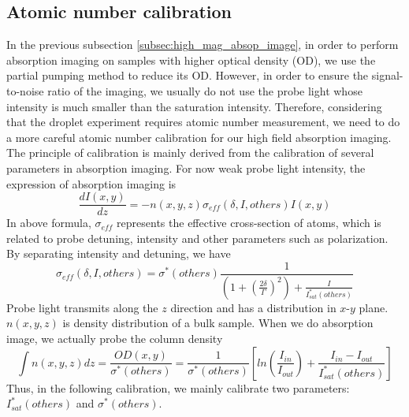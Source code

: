 \subsection{Atomic number calibration}

In the previous subsection \ref{subsec:high_mag_absop_image}, in order to perform absorption imaging on samples with higher optical density (OD), we use the partial pumping method to reduce its OD. However, in order to ensure the signal-to-noise ratio of the imaging, we usually do not use the probe light whose intensity is much smaller than the saturation intensity. Therefore, considering that the droplet experiment requires atomic number measurement, we need to do a more careful atomic number calibration for our high field absorption imaging. The principle of calibration is mainly derived from the calibration of several parameters in absorption imaging. For now weak probe light intensity, the expression of absorption imaging is
\begin{equation}
\frac{dI(x,y)}{dz}=-n(x,y,z)\sigma_{eff}(\delta,I,others)I(x,y)
\end{equation}
In above formula, $\sigma_{eff}$ represents the effective cross-section of atoms, which is related to probe detuning, intensity and other parameters such as polarization. By separating intensity and detuning, we have
\begin{equation}
\sigma_{eff}(\delta,I,others)=\sigma^*(others)\frac{1}{(1+(\frac{2\delta}{\Gamma})^2)+\frac{I}{I^*_{sat}(others)}}
\end{equation}
Probe light transmits along the $z$ direction and has a distribution in $x$-$y$ plane. $n(x,y,z)$ is density distribution of a bulk sample. When we do absorption image, we actually probe the column density
\begin{equation}
\label{sat_absorp_formula}
\int n(x,y,z)dz=\frac{OD(x,y)}{\sigma^*(others)}=\frac{1}{\sigma^*(others)}[ln(\frac{I_{in}}{I_{out}})+\frac{I_{in}-I_{out}}{I^*_{sat}(others)}]
\end{equation}
Thus, in the following calibration, we mainly calibrate two parameters: $I^*_{sat}(others)$ and $\sigma^*(others)$.

